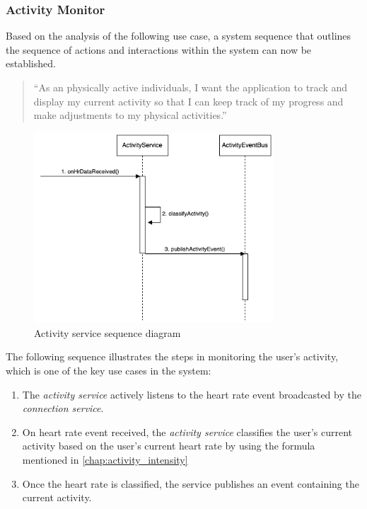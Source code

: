 \subsubsection{Activity Monitor}
\label{chap:activity_monitor_design}
Based on the analysis of the following use case, a system sequence that outlines the sequence of actions and interactions within the system can now be established.
\begin{quotation}
    \enquote{As an physically active individuals, I want the application to track and display my current activity so that I can keep track of my progress and make adjustments to my physical activities.} 
\end{quotation}

\begin{figure}[H]
    \centering
    \includegraphics[width=0.8\textwidth]{diagrams/activity-monitor-seq.drawio.png}
    \caption{Activity service sequence diagram}
    \label{fig:activity_diagram}
\end{figure}

The following sequence illustrates the steps in monitoring the user's activity, which is one of the key use cases in the system:
\begin{enumerate}
    \item The \emph{activity service} actively listens to the heart rate event broadcasted by the \emph{connection service}.
    \item On heart rate event received, the \emph{activity service} classifies the user's current activity based on the user's current heart rate by using the formula mentioned in \autoref{chap:activity_intensity}
    \item Once the heart rate is classified, the service publishes an event containing the current activity.
\end{enumerate}

